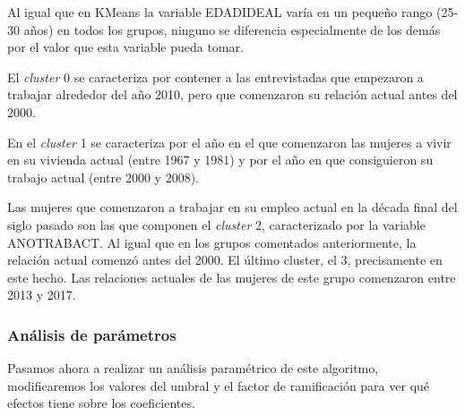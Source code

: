 \documentclass[a4paper, 20pt]{article}
\begin{document}
Al igual que en KMeans la variable EDADIDEAL varía en un pequeño rango (25-30 años) en todos los grupos, ninguno se diferencia especialmente de los demás por el valor que esta variable pueda tomar.

El \textit{cluster} 0 se caracteriza por contener a las entrevistadas que empezaron a trabajar alrededor del año 2010, pero que comenzaron su relación actual antes del 2000.

En el \textit{cluster} 1 se caracteriza por el año en el que comenzaron las mujeres a vivir en su vivienda actual (entre 1967 y 1981) y por el año en que consiguieron su trabajo actual (entre 2000 y 2008).

Las mujeres que comenzaron a trabajar en su empleo actual en la década final del siglo pasado son las que componen el \textit{cluster} 2, caracterizado por la variable ANOTRABACT. Al igual que en los grupos comentados anteriormente, la relación actual comenzó antes del 2000.
El último cluster, el 3, precisamente en este hecho. Las relaciones actuales de las mujeres de este grupo comenzaron entre 2013 y 2017.

\subsubsection{Análisis de parámetros}

Pasamos ahora a realizar un análisis paramétrico de este algoritmo, modificaremos los valores del umbral y el factor de ramificación para ver qué efectos tiene sobre los coeficientes.
\end{document}

